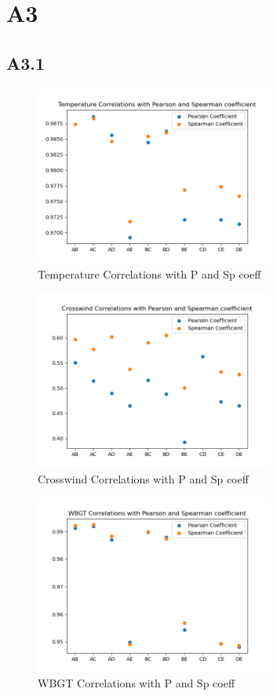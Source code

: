 \documentclass[a4paper,12pt]{article}
\begin{document}
\section{A3}
 \subsection{A3.1}
  \begin{figure}[H] 
 	\centering
 	\includegraphics[width=0.7\textwidth]{Temperature Correlations with P and Sp coeff.png}
 	\caption{Temperature Correlations with P and Sp coeff\cite{Maiullari2020}}
  \end{figure}
  \begin{figure}[H] 
 	\centering
 	\includegraphics[width=0.7\textwidth]{Crosswind Correlations with P and Sp coeff.png}
 	\caption{Crosswind Correlations with P and Sp coeff\cite{Maiullari2020}}
  \end{figure}
  \begin{figure}[H] 
 	\centering
 	\includegraphics[width=0.7\textwidth]{WBGT Correlations with P and Sp coeff.png}
 	\caption{WBGT Correlations with P and Sp coeff\cite{Maiullari2020}}
  \end{figure}
\end{document}
